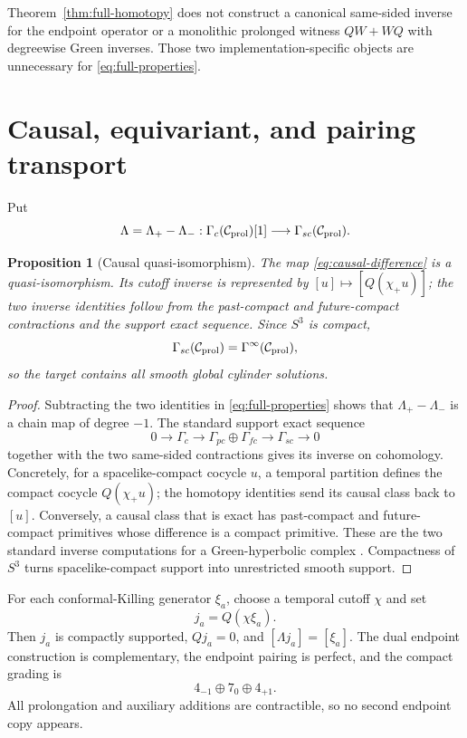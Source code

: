 \documentclass[11pt]{article}
\newtheorem{proposition}[theorem]{Proposition}
\theoremstyle{definition}
\theoremstyle{remark}
\newcommand{\cC}{\mathcal C}
\begin{document}
Theorem~\ref{thm:full-homotopy} does not construct a canonical same-sided
inverse for the endpoint operator or a monolithic prolonged witness
$QW+WQ$ with degreewise Green inverses.  Those two implementation-specific
objects are unnecessary for \eqref{eq:full-properties}.

\section{Causal, equivariant, and pairing transport}\label{sec:transport}

Put
\begin{equation}\label{eq:causal-difference}
 \Lambda=\Lambda_+-\Lambda_-:
 \Gamma_c(\cC_{\rm prol})[1]
 \longrightarrow\Gamma_{sc}(\cC_{\rm prol}).
\end{equation}

\begin{proposition}[Causal quasi-isomorphism]\label{prop:causal-QI}
The map \eqref{eq:causal-difference} is a quasi-isomorphism.  Its cutoff
inverse is represented by $[u]\mapsto[Q(\chi_+u)]$; the two inverse identities
follow from the past-compact and future-compact contractions and the support
exact sequence.  Since $S^3$ is compact,
\begin{equation}
 \Gamma_{sc}(\cC_{\rm prol})=\Gamma^\infty(\cC_{\rm prol}),
\end{equation}
so the target contains all smooth global cylinder solutions.
\end{proposition}

\begin{proof}
Subtracting the two identities in \eqref{eq:full-properties} shows that
$\Lambda_+-\Lambda_-$ is a chain map of degree $-1$.  The standard support
exact sequence
\[
 0\longrightarrow\Gamma_c
 \longrightarrow\Gamma_{pc}\oplus\Gamma_{fc}
 \longrightarrow\Gamma_{sc}\longrightarrow0
\]
together with the two same-sided contractions gives its inverse on
cohomology.  Concretely, for a spacelike-compact cocycle $u$, a temporal
partition defines the compact cocycle $Q(\chi_+u)$; the homotopy identities
send its causal class back to $[u]$.  Conversely, a causal class that is
exact has past-compact and future-compact primitives whose difference is a
compact primitive.  These are the two standard inverse computations for a
Green-hyperbolic complex \cite{GreenHyperbolic}.  Compactness of $S^3$
turns spacelike-compact support into unrestricted smooth support.
\end{proof}

For each conformal-Killing generator $\xi_a$, choose a temporal cutoff
$\chi$ and set
\begin{equation}\label{eq:CKV-source}
 j_a=Q(\chi\xi_a).
\end{equation}
Then $j_a$ is compactly supported, $Qj_a=0$, and
$[\Lambda j_a]=[\xi_a]$.  The dual endpoint construction is complementary,
the endpoint pairing is perfect, and the compact grading is
\begin{equation}\label{eq:CKV-grading}
 4_{-1}\oplus7_0\oplus4_{+1}.
\end{equation}
All prolongation and auxiliary additions are contractible, so no second
endpoint copy appears.
\end{document}
